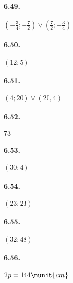 
\begin{htmulticols}{2}

\paragraph{6.49.} \(\left(-\frac 3 4;-\frac 7 2\right)\vee 
\left(\frac 7 2;-\frac 3 4\right)\)

\paragraph{6.50.} \((12;5)\)

\paragraph{6.51.} \((4;20)\vee (20,4)\)

\paragraph{6.52.} \(73\)

\paragraph{6.53.} \((30;4)\)

\paragraph{6.54.} \((23;23)\)

\paragraph{6.55.} \((32;48)\)

\paragraph{6.56.} \(2p=144\munit{cm}\)


\end{htmulticols}
